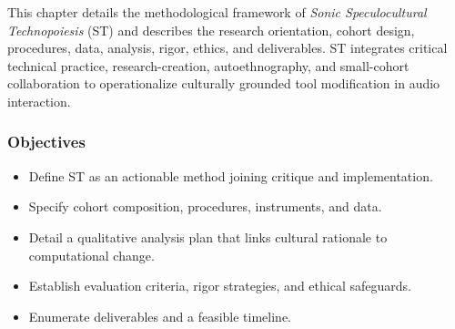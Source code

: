 

This chapter details the methodological framework of \textit{Sonic Speculocultural Technopoiesis} (ST) and describes the research orientation, cohort design, procedures, data, analysis, rigor, ethics, and deliverables. ST integrates critical technical practice, research-creation, autoethnography, and small-cohort collaboration to operationalize culturally grounded tool modification in audio interaction.

\subsubsection{Objectives}
\begin{itemize}[nosep]
	\item Define ST as an actionable method joining critique and implementation.
	\item Specify cohort composition, procedures, instruments, and data.
	\item Detail a qualitative analysis plan that links cultural rationale to computational change.
	\item Establish evaluation criteria, rigor strategies, and ethical safeguards.
	\item Enumerate deliverables and a feasible timeline.
\end{itemize}

